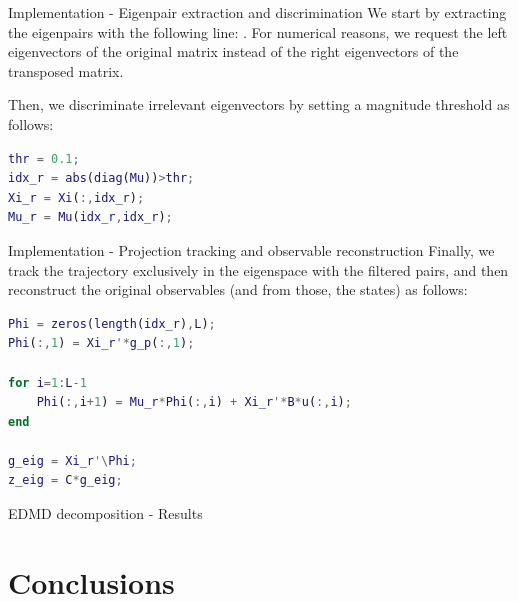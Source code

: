 \documentclass{beamer}
\begin{document}
\begin{frame}[fragile]{Implementation - Eigenpair extraction and discrimination}
    We start by extracting the eigenpairs with the following line: . For numerical reasons, we request the left eigenvectors of the original matrix instead of the right eigenvectors of the transposed matrix.

    Then, we discriminate irrelevant eigenvectors by setting a magnitude threshold as follows:

    \begin{lstlisting}[language=Matlab]
thr = 0.1;
idx_r = abs(diag(Mu))>thr;
Xi_r = Xi(:,idx_r);
Mu_r = Mu(idx_r,idx_r);
    \end{lstlisting}    
\end{frame}

\begin{frame}[fragile]{Implementation - Projection tracking and observable reconstruction}
    Finally, we track the trajectory exclusively in the eigenspace with the filtered pairs, and then reconstruct the original observables (and from those, the states) as follows:

    \begin{lstlisting}[language=Matlab]
Phi = zeros(length(idx_r),L);
Phi(:,1) = Xi_r'*g_p(:,1);

for i=1:L-1
    Phi(:,i+1) = Mu_r*Phi(:,i) + Xi_r'*B*u(:,i);
end

g_eig = Xi_r'\Phi;
z_eig = C*g_eig;
    \end{lstlisting}
\end{frame}

\begin{frame}{EDMD decomposition - Results}
    
\end{frame}


\section{Conclusions}
\end{document}
